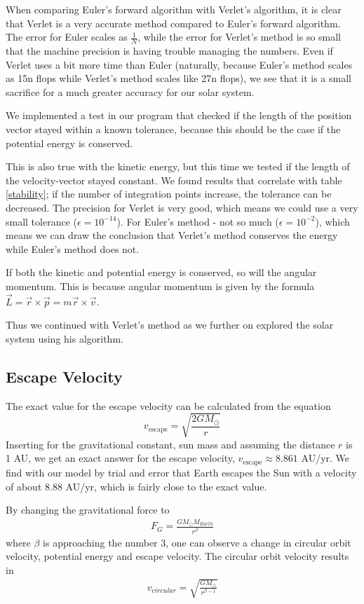 \documentclass{article}
\begin{document}
When comparing Euler's forward algorithm with Verlet's algorithm, it is clear that Verlet is a very accurate method compared to Euler's forward algorithm. The error for Euler scales as $\frac{1}{N}$, while the error for Verlet's method is so small that the machine precision is having trouble managing the numbers. Even if Verlet uses a bit more time than Euler (naturally, because Euler's method scales as 15n flops while Verlet's method scales like 27n flops), we see that it is a small sacrifice for a much greater accuracy for our solar system.

We implemented a test in our program that checked if the length of the position vector stayed within a known tolerance, because this should be the case if the potential energy is conserved.

This is also true with the kinetic energy, but this time we tested if the length of the velocity-vector stayed constant. We found results that correlate with table \ref{stability}; if the number of integration points increase, the tolerance can be decreased. The precision for Verlet is very good, which means we could use a very small tolerance ($\epsilon = 10^{-14}$). For Euler's method - not so much ($\epsilon = 10^{-2}$), which means we can draw the conclusion that Verlet's method conserves the energy while Euler's method does not.

If both the kinetic and potential energy is conserved, so will the angular momentum. This is because angular momentum is given by the formula $\vec{L}=\vec{r} \times \vec{p} =m \vec{r} \times \vec{v}$.


Thus we continued with Verlet's method as we further on explored the solar system using his algorithm.

\subsection{Escape Velocity}
The exact value for the escape velocity can be calculated from the equation
$$v_{\mathrm{escape}}=\sqrt{\frac{2GM_{\odot}}{r}}$$
Inserting for the gravitational constant, sun mass and assuming the distance $r$ is 1 AU, we get an exact answer for the escape velocity, $v_{\mathrm{escape}}\approx 8.861$ AU/yr. We find with our model by trial and error that Earth escapes the Sun with a velocity of about $8.88$ AU/yr, which is fairly close to the exact value.

By changing the gravitational force to
\begin{align*}
  F_G = \frac{GM_{\odot}M_{Earth}}{r^{\beta}}
\end{align*}
where $\beta$ is approaching the number $3$, one can observe a change in circular orbit velocity, potential energy and escape velocity. The circular orbit velocity results in
\begin{align*}
  v_{circular}=\sqrt{\frac{GM_{\odot}}{r^{\beta-1}}}
\end{align*}
\end{document}
